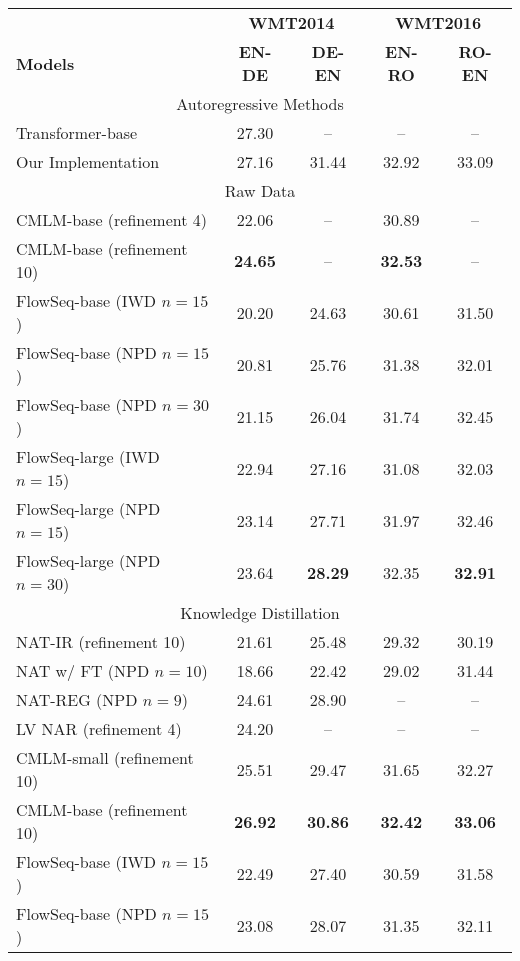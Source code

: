 \documentclass[11pt,a4paper]{article}
\begin{document}
\begin{table}[t]
\centering
\resizebox{1.0\columnwidth}{!}
{\begin{tabular}{lcccc}
\toprule
 & \multicolumn{2}{c}{\textbf{WMT2014}} & \multicolumn{2}{c}{\textbf{WMT2016}} \\
\textbf{ Models} & \textbf{EN-DE} & \textbf{DE-EN} & \textbf{EN-RO} & \textbf{RO-EN} \\
\midrule\midrule
\multicolumn{5}{c}{Autoregressive Methods} \\
\midrule
Transformer-base & 27.30 &  -- &  -- & -- \\
Our Implementation & 27.16 & 31.44 & 32.92 & 33.09 \\
\midrule\midrule
\multicolumn{5}{c}{Raw Data} \\
\midrule
CMLM-base (refinement 4) & 22.06 & -- & 30.89 & -- \\
CMLM-base (refinement 10) & \textbf{24.65} & -- & \textbf{32.53} & -- \\
\midrule
FlowSeq-base (IWD $n=15$) & 20.20 & 24.63 & 30.61 & 31.50 \\
FlowSeq-base (NPD $n=15$) & 20.81 & 25.76 & 31.38 & 32.01 \\
FlowSeq-base (NPD $n=30$) & 21.15 & 26.04 & 31.74 & 32.45 \\
\hdashline
FlowSeq-large (IWD $n=15$) & 22.94 & 27.16 & 31.08 & 32.03 \\
FlowSeq-large (NPD $n=15$) & 23.14 & 27.71 & 31.97 & 32.46 \\
FlowSeq-large (NPD $n=30$) & 23.64 & \textbf{28.29} & 32.35 & \textbf{32.91} \\
\midrule\midrule
\multicolumn{5}{c}{Knowledge Distillation} \\ 
\midrule
NAT-IR (refinement 10) & 21.61 &  25.48 & 29.32 & 30.19 \\
NAT w/ FT (NPD $n=10$) & 18.66 & 22.42 & 29.02 & 31.44 \\
NAT-REG (NPD $n=9$) & 24.61 & 28.90 & -- & -- \\
LV NAR (refinement 4) & 24.20 & -- & -- & -- \\
CMLM-small (refinement 10) & 25.51 & 29.47 & 31.65 & 32.27 \\
CMLM-base (refinement 10) & \textbf{26.92} & \textbf{30.86} & \textbf{32.42} & \textbf{33.06} \\
\midrule
FlowSeq-base (IWD $n=15$) & 22.49 & 27.40 & 30.59 & 31.58 \\
FlowSeq-base (NPD $n=15$) & 23.08 & 28.07 & 31.35 & 32.11 \\

\end{tabular}}
\end{table}
\end{document}
